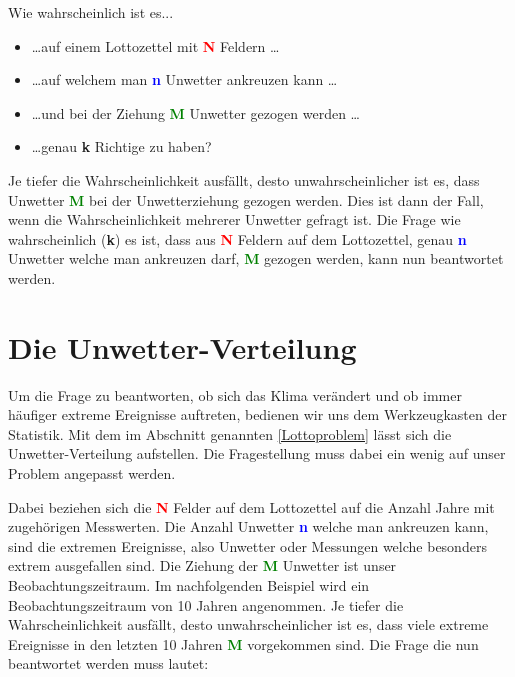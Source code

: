\begin{refsection}
Wie wahrscheinlich ist es...

\begin{itemize}
\item \dots auf einem Lottozettel mit \textcolor{red}{\textbf{N}} Feldern \dots
\item \dots auf welchem man \textcolor{blue}{\textbf{n}} Unwetter ankreuzen kann \dots
\item \dots und bei der Ziehung \textcolor{green}{\textbf{M}} Unwetter gezogen werden \dots
\item \dots genau \textcolor{darkyellow}{\textbf{k}} Richtige zu haben?
\end{itemize}

Je tiefer die Wahrscheinlichkeit ausfällt, desto unwahrscheinlicher
ist es, dass Unwetter \textcolor{green}{\textbf{M}} bei der
Unwetterziehung gezogen werden. Dies ist dann der Fall, wenn die
Wahrscheinlichkeit mehrerer Unwetter gefragt ist. Die Frage wie
wahrscheinlich (\textcolor{darkyellow}{\textbf{k}}) es ist, dass aus
\textcolor{red}{\textbf{N}} Feldern auf dem Lottozettel, genau
\textcolor{blue}{\textbf{n}} Unwetter welche man ankreuzen darf,
\textcolor{green}{\textbf{M}} gezogen werden, kann nun beantwortet
werden.


\section{Die Unwetter-Verteilung} \label{UnwetterVert}
Um die Frage zu beantworten, ob sich das Klima verändert und ob immer häufiger extreme Ereignisse auftreten, bedienen wir uns dem Werkzeugkasten der Statistik. Mit dem im Abschnitt genannten \ref{Lottoproblem} lässt sich die Unwetter-Verteilung aufstellen. Die Fragestellung muss dabei ein wenig auf unser Problem angepasst werden.

Dabei beziehen sich die \textcolor{red}{\textbf{N}} Felder auf dem Lottozettel auf die Anzahl Jahre mit zugehörigen Messwerten. Die Anzahl Unwetter \textcolor{blue}{\textbf{n}} welche man ankreuzen kann, sind die extremen Ereignisse, also Unwetter oder Messungen welche besonders extrem ausgefallen sind. Die Ziehung der \textcolor{green}{\textbf{M}} Unwetter ist unser Beobachtungszeitraum. Im nachfolgenden Beispiel wird ein Beobachtungszeitraum von 10 Jahren angenommen. Je tiefer die Wahrscheinlichkeit ausfällt, desto unwahrscheinlicher ist es, dass viele extreme Ereignisse in den letzten 10 Jahren \textcolor{green}{\textbf{M}} vorgekommen sind. Die Frage die nun beantwortet werden muss lautet:


\end{refsection}
